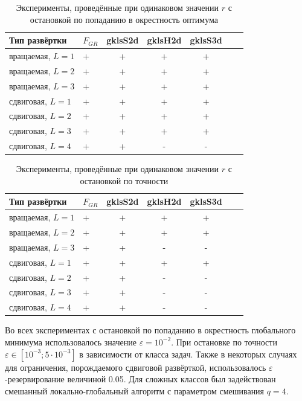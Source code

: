 \documentclass[a4paper]{article}
\begin{document}
\begin{table}
\begin{center}
\caption{Эксперименты, проведённые при одинаковом значении $r$ с остановкой по попаданию в окрестность оптимума}
  \begin{tabular}{l|l*{4}{c}r}
    \label{table:exp3}
  Тип развёртки & $F_{GR}$ & gklsS2d & gklsH2d & gklsS3d \\
  \hline
  вращаемая, $L=1$ & + & + & + & + \\
  вращаемая, $L=2$ & + & + & + & + \\
  вращаемая, $L=3$ & + & + & + & + \\
  сдвиговая, $L=1$ & + & + & + & + \\
  сдвиговая, $L=2$ & + & + & + & + \\
  сдвиговая, $L=3$ & + & + & + & + \\
  сдвиговая, $L=4$ & + & + & - & - \\
  \end{tabular}
\end{center}
\end{table}

\begin{table}
\begin{center}
\caption{Эксперименты, проведённые при одинаковом значении $r$ с остановкой по точности}
  \begin{tabular}{l|l*{4}{c}r}
    \label{table:exp4}
  Тип развёртки & $F_{GR}$ & gklsS2d & gklsH2d & gklsS3d \\
  \hline
  вращаемая, $L=1$ & + & + & + & + \\
  вращаемая, $L=2$ & + & + & + & + \\
  вращаемая, $L=3$ & + & + & - & - \\
  сдвиговая, $L=1$ & + & + & + & + \\
  сдвиговая, $L=2$ & + & + & - & - \\
  сдвиговая, $L=3$ & + & + & - & - \\
  сдвиговая, $L=4$ & + & + & - & - \\
  \end{tabular}
\end{center}
\end{table}

Во всех экспериментах с остановкой по попаданию в окрестность глобального минимума использовалось значение
$\varepsilon=10^{-2}$. При остановке по точности $\varepsilon \in [10^{-3};5\cdot 10^{-3}]$ в зависимости от класса задач.
Также в некоторых случаях для ограничения, порождаемого сдвиговой развёрткой, использовалось $\varepsilon$-резервирование
величиной 0.05. Для сложных классов был задействован смешанный локально-глобальный алгоритм с параметром смешивания $q=4$.
\end{document}
